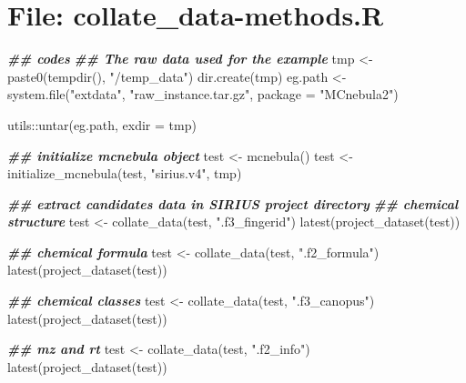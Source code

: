 \documentclass[
]{article}
\newenvironment{Shaded}{\begin{snugshade}}{\end{snugshade}}
\newcommand{\AttributeTok}[1]{\textcolor[rgb]{0.77,0.63,0.00}{#1}}
\newcommand{\DocumentationTok}[1]{\textcolor[rgb]{0.56,0.35,0.01}{\textbf{\textit{#1}}}}
\newcommand{\FunctionTok}[1]{\textcolor[rgb]{0.00,0.00,0.00}{#1}}
\newcommand{\NormalTok}[1]{#1}
\newcommand{\OtherTok}[1]{\textcolor[rgb]{0.56,0.35,0.01}{#1}}
\newcommand{\SpecialCharTok}[1]{\textcolor[rgb]{0.00,0.00,0.00}{#1}}
\newcommand{\StringTok}[1]{\textcolor[rgb]{0.31,0.60,0.02}{#1}}
\begin{document}
\hypertarget{file-collate_data-methods.r}{%
\section{File: collate\_data-methods.R}\label{file-collate_data-methods.r}}

\begin{Shaded}
\begin{Highlighting}[]
\DocumentationTok{\#\# codes}
\DocumentationTok{\#\# The raw data used for the example}
\NormalTok{tmp }\OtherTok{\textless{}{-}} \FunctionTok{paste0}\NormalTok{(}\FunctionTok{tempdir}\NormalTok{(), }\StringTok{"/temp\_data"}\NormalTok{)}
\FunctionTok{dir.create}\NormalTok{(tmp)}
\NormalTok{eg.path }\OtherTok{\textless{}{-}} \FunctionTok{system.file}\NormalTok{(}\StringTok{"extdata"}\NormalTok{, }\StringTok{"raw\_instance.tar.gz"}\NormalTok{,}
                       \AttributeTok{package =} \StringTok{"MCnebula2"}\NormalTok{)}

\NormalTok{utils}\SpecialCharTok{::}\FunctionTok{untar}\NormalTok{(eg.path, }\AttributeTok{exdir =}\NormalTok{ tmp)}

\DocumentationTok{\#\# initialize \textquotesingle{}mcnebula\textquotesingle{} object}
\NormalTok{test }\OtherTok{\textless{}{-}} \FunctionTok{mcnebula}\NormalTok{()}
\NormalTok{test }\OtherTok{\textless{}{-}} \FunctionTok{initialize\_mcnebula}\NormalTok{(test, }\StringTok{"sirius.v4"}\NormalTok{, tmp)}

\DocumentationTok{\#\# extract candidates data in SIRIUS project directory}
\DocumentationTok{\#\# chemical structure}
\NormalTok{test }\OtherTok{\textless{}{-}} \FunctionTok{collate\_data}\NormalTok{(test, }\StringTok{".f3\_fingerid"}\NormalTok{)}
\FunctionTok{latest}\NormalTok{(}\FunctionTok{project\_dataset}\NormalTok{(test))}

\DocumentationTok{\#\# chemical formula}
\NormalTok{test }\OtherTok{\textless{}{-}} \FunctionTok{collate\_data}\NormalTok{(test, }\StringTok{".f2\_formula"}\NormalTok{)}
\FunctionTok{latest}\NormalTok{(}\FunctionTok{project\_dataset}\NormalTok{(test))}

\DocumentationTok{\#\# chemical classes}
\NormalTok{test }\OtherTok{\textless{}{-}} \FunctionTok{collate\_data}\NormalTok{(test, }\StringTok{".f3\_canopus"}\NormalTok{)}
\FunctionTok{latest}\NormalTok{(}\FunctionTok{project\_dataset}\NormalTok{(test))}

\DocumentationTok{\#\# mz and rt}
\NormalTok{test }\OtherTok{\textless{}{-}} \FunctionTok{collate\_data}\NormalTok{(test, }\StringTok{".f2\_info"}\NormalTok{)}
\FunctionTok{latest}\NormalTok{(}\FunctionTok{project\_dataset}\NormalTok{(test))}


\end{Highlighting}
\end{Shaded}
\end{document}
